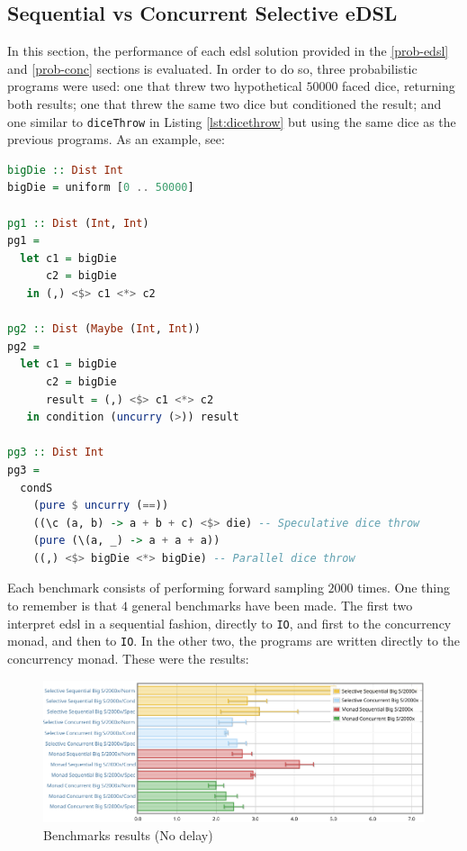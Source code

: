 \documentclass[
  oneside,
  11pt, a4paper,
  footinclude=true,
  headinclude=true,
  cleardoublepage=empty
]{scrbook}
\theoremstyle{definition}
\theoremstyle{definition}
\begin{document}
    \subsection{Sequential vs Concurrent Selective eDSL}
        In this section, the performance of each \gls{edsl} solution provided in the \ref{prob-edsl} and \ref{prob-conc} sections is evaluated. In order to do so, three probabilistic programs were used: one that threw two hypothetical $50000$ faced dice, returning both results; one that threw the same two dice but conditioned the result; and one similar to \texttt{diceThrow} in Listing \ref{lst:dicethrow} but using the same dice as the previous programs. As an example, see:
        
        \begin{lstlisting}[language=Haskell, caption={Programs used in evaluation}, captionpos=b]
bigDie :: Dist Int
bigDie = uniform [0 .. 50000]

pg1 :: Dist (Int, Int)
pg1 =
  let c1 = bigDie
      c2 = bigDie
   in (,) <$> c1 <*> c2

pg2 :: Dist (Maybe (Int, Int))
pg2 =
  let c1 = bigDie
      c2 = bigDie
      result = (,) <$> c1 <*> c2
   in condition (uncurry (>)) result

pg3 :: Dist Int
pg3 =
  condS
    (pure $ uncurry (==))
    ((\c (a, b) -> a + b + c) <$> die) -- Speculative dice throw
    (pure (\(a, _) -> a + a + a))
    ((,) <$> bigDie <*> bigDie) -- Parallel dice throw
        \end{lstlisting}{}
        
    Each benchmark consists of performing forward sampling $2000$ times. One thing to remember is that $4$ general benchmarks have been made. The first two interpret \gls{edsl} in a sequential fashion, directly to \texttt{IO}, and first to the concurrency monad, and then to \texttt{IO}. In the other two, the programs are written directly to the concurrency monad. These were the results:
    
    \begin{figure}[H]
        \centering
        \includegraphics{img/no-delay.pdf}
        \caption{Benchmarks results (No delay)}
        \label{fig:no-delay}
    \end{figure}
    
\end{document}
